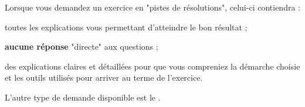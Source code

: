Lorsque vous demandez un exercice en "pistes de résolutions", celui-ci contiendra :
\item toutes les explications vous permettant d'atteindre le bon résultat ;
\item \textbf{aucune réponse} "directe" aux questions ;
\item des explications claires et détaillées pour que vous compreniez la démarche choisie et les outils utilisés pour arriver au terme de l'exercice.

L'autre type de demande disponible est le .
